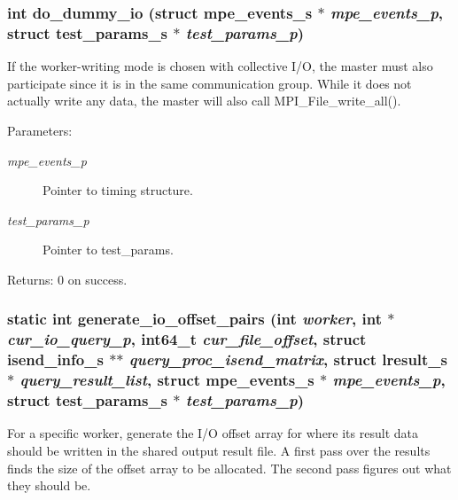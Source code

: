 \subsubsection{\setlength{\rightskip}{0pt plus 5cm}int do\_\-dummy\_\-io (struct \bf{mpe\_\-events\_\-s} $\ast$ {\em mpe\_\-events\_\-p}, struct \bf{test\_\-params\_\-s} $\ast$ {\em test\_\-params\_\-p})}\label{master__help_8c_e231da1fc42ba547786bccfd1dae9c4e}


If the worker-writing mode is chosen with collective I/O, the master must also participate since it is in the same communication group. While it does not actually write any data, the master will also call MPI\_\-File\_\-write\_\-all().

\begin{Desc}
\item[Parameters:]
\begin{description}
\item[{\em mpe\_\-events\_\-p}]Pointer to timing structure. \item[{\em test\_\-params\_\-p}]Pointer to test\_\-params. \end{description}
\end{Desc}
\begin{Desc}
\item[Returns:]0 on success. \end{Desc}
\subsubsection{\setlength{\rightskip}{0pt plus 5cm}static int generate\_\-io\_\-offset\_\-pairs (int {\em worker}, int $\ast$ {\em cur\_\-io\_\-query\_\-p}, int64\_\-t {\em cur\_\-file\_\-offset}, struct \bf{isend\_\-info\_\-s} $\ast$$\ast$ {\em query\_\-proc\_\-isend\_\-matrix}, struct \bf{lresult\_\-s} $\ast$ {\em query\_\-result\_\-list}, struct \bf{mpe\_\-events\_\-s} $\ast$ {\em mpe\_\-events\_\-p}, struct \bf{test\_\-params\_\-s} $\ast$ {\em test\_\-params\_\-p})\hspace{0.3cm}{\tt  [static]}}\label{master__help_8c_c98cb63fa4e9f236a7ba8ca49d1d8eef}


For a specific worker, generate the I/O offset array for where its result data should be written in the shared output result file. A first pass over the results finds the size of the offset array to be allocated. The second pass figures out what they should be.

